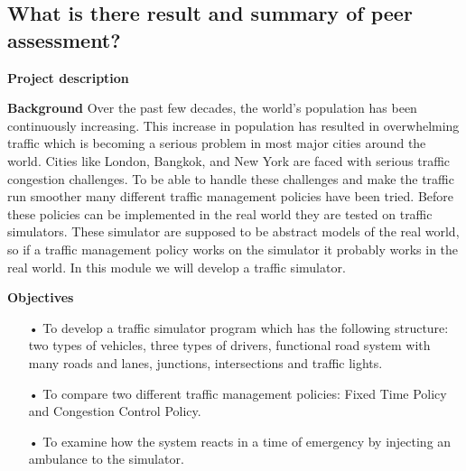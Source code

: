 \documentclass[11pt]{article}
\begin{document}
	\subsection{What is there result and summary of peer assessment?}

\newpage	



\appendix %






\textbf{Project description}


\textbf{Background}
Over the past few decades, the world's population has been continuously increasing. This increase in population has resulted in overwhelming traffic which is becoming a serious problem in most major cities around the world. Cities like London, Bangkok, and New York are faced with serious traffic congestion challenges. To be able to handle these challenges and make the traffic run smoother many different traffic management policies have been tried. Before these policies can be implemented in the real world they are tested on traffic simulators. These simulator are supposed to be abstract models of the real world, so if a traffic management policy works on the simulator it probably works in the real world. In this module we will develop a traffic simulator.


\textbf{Objectives}
\begin{itemize}
\item[•] To develop a traffic simulator program which has the following structure: two types of vehicles, three types of drivers, functional road system with many roads and lanes, junctions, intersections and traffic lights.
\item[•] To compare two different traffic management policies: Fixed Time Policy and Congestion Control Policy.
\item[•] To examine how the system reacts in a time of emergency by injecting an ambulance to the simulator.
\end{itemize}
\end{document}
